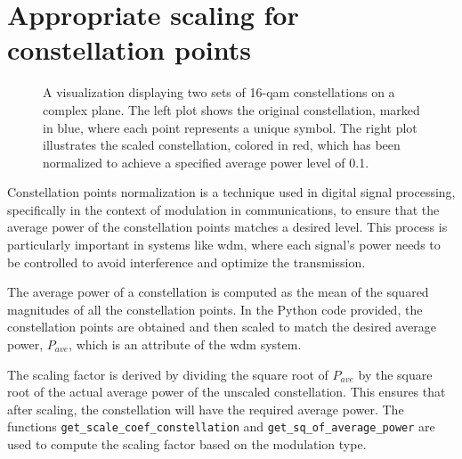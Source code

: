 \section{Appropriate scaling for constellation points}
\label{sec:scaling}

\begin{figure}[h]
    \caption{A visualization displaying two sets of 16-\acrshort{qam} constellations on a complex plane. The left plot shows the original constellation, marked in blue, where each point represents a unique symbol. The right plot illustrates the scaled constellation, colored in red, which has been normalized to achieve a specified average power level of 0.1.}
    \label{fig:constellation_scale}
\end{figure}

Constellation points normalization is a technique used in digital signal processing, specifically in the context of modulation in communications, to ensure that the average power of the constellation points matches a desired level. This process is particularly important in systems like \acrfull{wdm}, where each signal's power needs to be controlled to avoid interference and optimize the transmission.

The average power of a constellation is computed as the mean of the squared magnitudes of all the constellation points. In the Python code provided, the constellation points are obtained and then scaled to match the desired average power, $P_{ave}$, which is an attribute of the \acrshort{wdm} system.

The scaling factor is derived by dividing the square root of $P_{ave}$ by the square root of the actual average power of the unscaled constellation. This ensures that after scaling, the constellation will have the required average power. The functions \texttt{get\_scale\_coef\_constellation} and \texttt{get\_sq\_of\_average\_power} are used to compute the scaling factor based on the modulation type.

